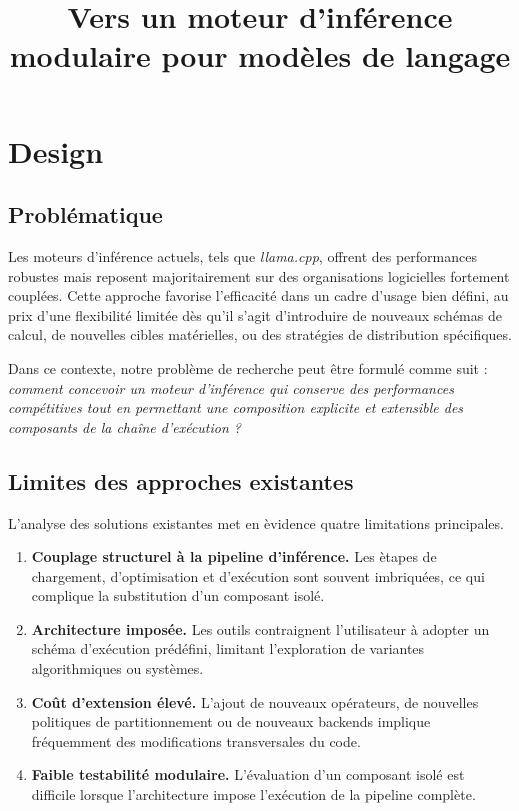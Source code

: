 \documentclass[11pt,a4paper]{article}
\title{Vers un moteur d'inf\'erence modulaire pour mod\`eles de langage}
\author{}
\date{}
\begin{document}
\maketitle

\section{Design}

\subsection{Probl\'ematique}

Les moteurs d'inf\'erence actuels, tels que \textit{llama.cpp}, offrent des performances robustes mais reposent majoritairement sur des organisations logicielles fortement coupl\'ees. Cette approche favorise l'efficacit\'e dans un cadre d'usage bien d\'efini, au prix d'une flexibilit\'e limit\'ee d\`es qu'il s'agit d'introduire de nouveaux sch\'emas de calcul, de nouvelles cibles mat\'erielles, ou des strat\'egies de distribution sp\'ecifiques.

Dans ce contexte, notre probl\`eme de recherche peut \^etre formul\'e comme suit : \textit{comment concevoir un moteur d'inf\'erence qui conserve des performances comp\'etitives tout en permettant une composition explicite et extensible des composants de la cha\^ine d'ex\'ecution ?}

\subsection{Limites des approches existantes}

L'analyse des solutions existantes met en \`evidence quatre limitations principales.

\begin{enumerate}[leftmargin=*]
	\item \textbf{Couplage structurel \`a la pipeline d'inf\'erence.} Les \`etapes de chargement, d'optimisation et d'ex\'ecution sont souvent imbriqu\'ees, ce qui complique la substitution d'un composant isol\'e.
	\item \textbf{Architecture impos\'ee.} Les outils contraignent l'utilisateur \`a adopter un sch\'ema d'ex\'ecution pr\'ed\'efini, limitant l'exploration de variantes algorithmiques ou syst\`emes.
	\item \textbf{Co\^ut d'extension \'elev\'e.} L'ajout de nouveaux op\'erateurs, de nouvelles politiques de partitionnement ou de nouveaux backends implique fr\'equemment des modifications transversales du code.
	\item \textbf{Faible testabilit\'e modulaire.} L'\'evaluation d'un composant isol\'e est difficile lorsque l'architecture impose l'ex\'ecution de la pipeline compl\`ete.
\end{enumerate}
\end{document}
